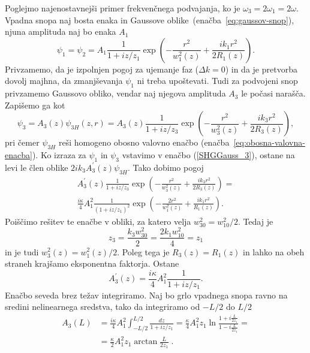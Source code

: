 Poglejmo najenostavnejši primer frekvenčnega podvajanja, ko je 
$\omega_{3}=2\omega_{1}=2\omega$.
Vpadna snopa naj bosta enaka in Gaussove oblike~(enačba~\ref{eq:gaussov-snop}), 
njuna amplituda  naj bo enaka $A_1$
\begin{equation}
\psi_{1} = \psi_2 = A_{1}\frac{1}{1+iz/z_1}
\exp\left(-\frac{r^{2}}{w_1^{2}(z)}+\frac{ik_1r^{2}}{2R_1(z)}\right).
\label{8.21}
\end{equation}
Privzamemo, da je izpolnjen pogoj za ujemanje faz 
($\Delta k=0$) in da je pretvorba dovolj majhna, da zmanjševanja $\psi_{1}$
ni treba upoštevati. Tudi za podvojeni snop privzamemo Gaussovo 
obliko, vendar naj njegova amplituda $A_3$ le počasi narašča. Zapišemo ga kot
\begin{equation}
\psi_{3}=A_{3}(z)\psi_{3H}(z,r)=A_{3}(z)\frac{1}{1+iz/z_{3}}
\exp\left(-\frac{r^{2}}{w_{3}^{2}(z)}+\frac{ik_{3}r^{2}}{2R_{3}(z)}\right),
\label{8.22}
\end{equation}
pri čemer $\psi_{3H}$ reši homogeno obosno valovno 
enačbo (enačba~\ref{eq:obosna-valovna-enacba}). Ko izraza za $\psi_{1}$
in $\psi_{3}$ vstavimo v enačbo (\ref{SHGGauss_3}),
ostane na levi le člen oblike $2ik_{3}A_{3}^{\prime}(z)\psi_{3H}$. Tako dobimo pogoj
\begin{multline}
A_{3}^{\prime}(z)\frac{1}{1+iz/z_3}\exp\left(-\frac{r^{2}}{w_{3}^{2}(z)}+\frac{ik_{3}r^{2}}
{2R_{3}(z)}\right)=\\
\frac{i\kappa}{4}A_{1}^{2}\frac{1}{(1+iz/z_{1})^{2}}\exp\left(-\frac{2r^{2}}
{w_{1}^{2}(z)}+\frac{ik_{1}r^{2}}{R_{1}(z)}\right).
\label{8.23}
\end{multline}
Poiščimo rešitev te enačbe v obliki, za katero velja $w_{30}^{2}=w_{10}^{2}/2$. Tedaj je 
\begin{equation}
z_{3}=\frac{k_{3}w_{30}^{2}}{2}=\frac{2k_{1}w_{10}^{2}}{4}=z_{1}
\end{equation}
in je tudi $w_{3}^{2}(z)=w_{1}^{2}(z)/2$. Poleg tega je $R_{3}(z)=R_{1}(z)$
in lahko na obeh straneh krajšamo eksponentna faktorja. Ostane 
\begin{equation}
A_{3}^{\prime}(z)=\frac{i\kappa}{4}A_{1}^{2}\frac{1}{1+iz/z_1}.
\label{8.24}
\end{equation}
Enačbo seveda brez težav integriramo. Naj bo grlo vpadnega
snopa ravno na sredini nelinearnega sredstva, tako da integriramo
od $-L/2$ do $L/2$
\begin{align}
A_{3}(L) & =  \frac{i\kappa}{4}A_{1}^{2}\int_{-L/2}^{L/2}\frac{dz}{1+iz/z_1} 
  = \frac{\kappa}{4}A_{1}^{2}z_{1}\ln\frac{1+i\frac{L}{2z_{1}}}{1-i\frac{L}{2z_{1}}}= \nonumber \\
 & =  \frac{\kappa}{2}A_{1}^{2}z_{1}\arctan\frac{L}{2z_{1}}\;.
\end{align}
